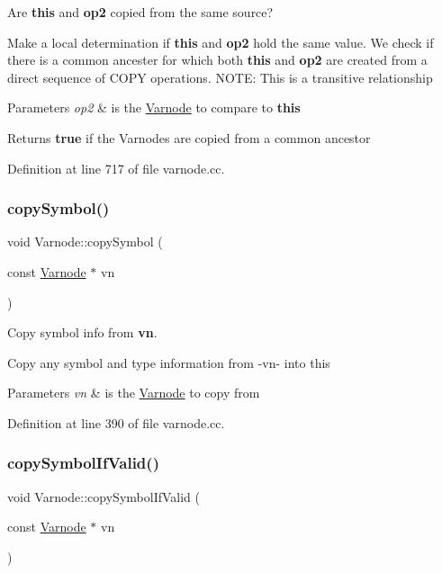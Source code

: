 Are {\bfseries{this}} and {\bfseries{op2}} copied from the same source? 

Make a local determination if {\bfseries{this}} and {\bfseries{op2}} hold the same value. We check if there is a common ancester for which both {\bfseries{this}} and {\bfseries{op2}} are created from a direct sequence of C\+O\+PY operations. N\+O\+TE\+: This is a transitive relationship 
\begin{DoxyParams}{Parameters}
{\em op2} & is the \mbox{\hyperlink{class_varnode}{Varnode}} to compare to {\bfseries{this}} \\
\hline
\end{DoxyParams}
\begin{DoxyReturn}{Returns}
{\bfseries{true}} if the Varnodes are copied from a common ancestor 
\end{DoxyReturn}


Definition at line 717 of file varnode.\+cc.

\mbox{\label{class_varnode_a5b21f0980bc223331c25bf4e609b1254}} 
\subsubsection{\texorpdfstring{copySymbol()}{copySymbol()}}
{\footnotesize\ttfamily void Varnode\+::copy\+Symbol (\begin{DoxyParamCaption}\item[{const \mbox{\hyperlink{class_varnode}{Varnode}} $\ast$}]{vn }\end{DoxyParamCaption})}



Copy symbol info from {\bfseries{vn}}. 

Copy any symbol and type information from -\/vn-\/ into this 
\begin{DoxyParams}{Parameters}
{\em vn} & is the \mbox{\hyperlink{class_varnode}{Varnode}} to copy from \\
\hline
\end{DoxyParams}


Definition at line 390 of file varnode.\+cc.

\mbox{\label{class_varnode_a436ec606351beaa6fb2fe7dc1bb4312c}} 
\subsubsection{\texorpdfstring{copySymbolIfValid()}{copySymbolIfValid()}}
{\footnotesize\ttfamily void Varnode\+::copy\+Symbol\+If\+Valid (\begin{DoxyParamCaption}\item[{const \mbox{\hyperlink{class_varnode}{Varnode}} $\ast$}]{vn }\end{DoxyParamCaption})}



